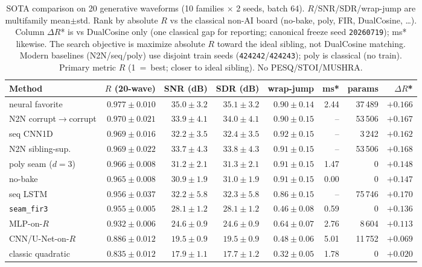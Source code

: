 \begin{table}[t]
  \centering
  \caption{SOTA comparison on 20 generative waveforms (10 families $\times$ 2 seeds, batch 64).
  $R$/SNR/SDR/wrap-jump are multifamily mean$\pm$std. Rank by absolute $R$ vs the classical non-AI board (no-bake, poly, FIR, DualCosine, \ldots).
  Column $\Delta R$* is vs DualCosine only (one classical gap for reporting; canonical freeze seed \texttt{20260719}); ms* likewise.
  The search objective is maximize absolute $R$ toward the ideal sibling, not DualCosine matching.
  Modern baselines (N2N/seq/poly) use disjoint train seeds (\texttt{424242}/\texttt{424243}); poly is classical (no train).
  Primary metric $R$ (1~=~best; closer to ideal sibling). No PESQ/STOI/MUSHRA.}
  \label{tab:sota-main}
  \setlength{\tabcolsep}{2.2pt}
  \begin{tabular}{@{}lrrrrrrr@{}}
    \toprule
    Method & $R$ (20-wave) & SNR (dB) & SDR (dB) & wrap-jump & ms* & params & $\Delta R$* \\
    \midrule
    neural favorite & $0.977\pm0.010$ & $35.0\pm3.2$ & $35.1\pm3.2$ & $0.90\pm0.14$ & 2.44 & 37\,489 & ${+}0.166$ \\
    N2N corrupt$\to$corrupt & $0.970\pm0.021$ & $33.9\pm4.1$ & $34.0\pm4.1$ & $0.90\pm0.15$ & -- & 53\,506 & ${+}0.167$ \\
    seq CNN1D & $0.969\pm0.016$ & $32.2\pm3.5$ & $32.4\pm3.5$ & $0.92\pm0.15$ & -- & 3\,242 & ${+}0.162$ \\
    N2N sibling-sup. & $0.969\pm0.022$ & $33.7\pm4.3$ & $33.8\pm4.3$ & $0.91\pm0.15$ & -- & 53\,506 & ${+}0.168$ \\
    poly seam ($d{=}3$) & $0.966\pm0.008$ & $31.2\pm2.1$ & $31.3\pm2.1$ & $0.91\pm0.15$ & 1.47 & 0 & ${+}0.148$ \\
    no-bake & $0.965\pm0.008$ & $30.9\pm1.9$ & $31.0\pm1.9$ & $0.91\pm0.15$ & 0.00 & 0 & ${+}0.147$ \\
    seq LSTM & $0.956\pm0.037$ & $32.2\pm5.8$ & $32.3\pm5.8$ & $0.86\pm0.15$ & -- & 75\,746 & ${+}0.170$ \\
    \texttt{seam\_fir3} & $0.955\pm0.005$ & $28.1\pm1.2$ & $28.1\pm1.2$ & $0.46\pm0.08$ & 0.59 & 0 & ${+}0.136$ \\
    MLP-on-$R$ & $0.932\pm0.006$ & $24.6\pm0.9$ & $24.6\pm0.9$ & $0.64\pm0.07$ & 2.76 & 8\,604 & ${+}0.113$ \\
    CNN/U-Net-on-$R$ & $0.886\pm0.012$ & $19.5\pm0.9$ & $19.5\pm0.9$ & $0.48\pm0.06$ & 5.01 & 11\,752 & ${+}0.069$ \\
    classic quadratic & $0.835\pm0.012$ & $17.9\pm1.1$ & $17.7\pm1.2$ & $0.32\pm0.05$ & 1.78 & 0 & ${+}0.020$ \\

\end{tabular}
\end{table}
